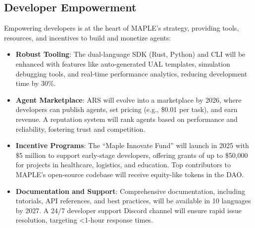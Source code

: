 \documentclass[a4paper,11pt]{article}
\begin{document}
\subsection{Developer Empowerment}
Empowering developers is at the heart of MAPLE’s strategy, providing tools, resources, and incentives to build and monetize agents:
\begin{itemize}[leftmargin=*]
    \item \textbf{Robust Tooling}: The dual-language SDK (Rust, Python) and CLI will be enhanced with features like auto-generated UAL templates, simulation debugging tools, and real-time performance analytics, reducing development time by 30\%.
    \item \textbf{Agent Marketplace}: ARS will evolve into a marketplace by 2026, where developers can publish agents, set pricing (e.g., \$0.01 per task), and earn revenue. A reputation system will rank agents based on performance and reliability, fostering trust and competition.
    \item \textbf{Incentive Programs}: The “Maple Innovate Fund” will launch in 2025 with \$5 million to support early-stage developers, offering grants of up to \$50,000 for projects in healthcare, logistics, and education. Top contributors to MAPLE’s open-source codebase will receive equity-like tokens in the DAO.
    \item \textbf{Documentation and Support}: Comprehensive documentation, including tutorials, API references, and best practices, will be available in 10 languages by 2027. A 24/7 developer support Discord channel will ensure rapid issue resolution, targeting <1-hour response times.
\end{itemize}
\end{document}
